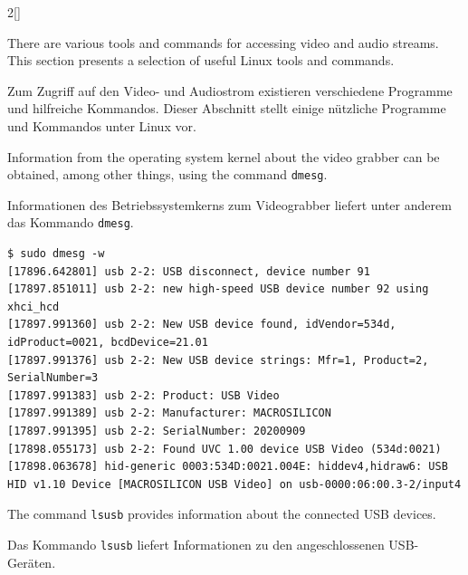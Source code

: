 \begin{paracol}{2}[]
\colstart

There are various tools and commands for accessing video and audio streams. This section presents a selection of useful Linux tools and commands.

\colger

Zum Zugriff auf den Video- und Audiostrom existieren verschiedene Programme und hilfreiche Kommandos. Dieser Abschnitt stellt einige nützliche Programme und Kommandos unter Linux vor.

\coleng

Information from the operating system kernel about the video grabber can be obtained, among other things, using the command \verb!dmesg!.

\colger

Informationen des Betriebssystemkerns zum Videograbber liefert unter anderem das Kommando \verb!dmesg!.

\colende


\begin{lstlisting}[style=shell]
$ sudo dmesg -w
[17896.642801] usb 2-2: USB disconnect, device number 91
[17897.851011] usb 2-2: new high-speed USB device number 92 using xhci_hcd
[17897.991360] usb 2-2: New USB device found, idVendor=534d, idProduct=0021, bcdDevice=21.01
[17897.991376] usb 2-2: New USB device strings: Mfr=1, Product=2, SerialNumber=3
[17897.991383] usb 2-2: Product: USB Video
[17897.991389] usb 2-2: Manufacturer: MACROSILICON
[17897.991395] usb 2-2: SerialNumber: 20200909
[17898.055173] usb 2-2: Found UVC 1.00 device USB Video (534d:0021)
[17898.063678] hid-generic 0003:534D:0021.004E: hiddev4,hidraw6: USB HID v1.10 Device [MACROSILICON USB Video] on usb-0000:06:00.3-2/input4
\end{lstlisting}
\FloatBarrier

\colstart

The command \verb!lsusb! provides information about the connected USB devices.

\colger

Das Kommando \verb!lsusb! liefert Informationen zu den angeschlossenen USB-Geräten.


\end{paracol}
